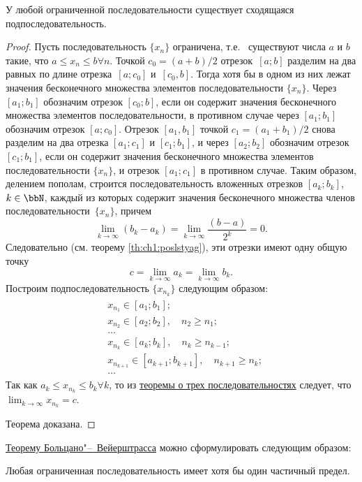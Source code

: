 \begin{thm}\label{th:ch1:TBV}
 У любой ограниченной последовательности существует сходящаяся подпоследовательность.
\end{thm}
\begin{proof}
Пусть последовательность $\{x_n\}$ ограничена, т.е.~ существуют числа $a$ и $b$ такие, что $a \le x_n \le b$\quad$\forall n$. Точкой
$c_0 = (a + b)/2$ отрезок~$[a; b]$ разделим на два равных по длине отрезка~$[a; c_0]$ и~$[c_0,b]$. Тогда хотя бы в одном из них лежат значения бесконечного множества элементов последовательности $\{x_n\}$. Через $[a_1;b_1]$ обозначим отрезок $[c_0;b]$, если он содержит значения бесконечного множества элементов последовательности, в противном случае через $[a_1; b_1]$ обозначим отрезок $[a; c_0]$. Отрезок $[a_1, b_1]$ точкой $c_1 = (a_1 + b_1)/2$ снова разделим на два отрезка $[a_1;c_1]$ и $[c_1;b_1]$, и через $[a_2;b_2]$ обозначим отрезок $[c_1;b_1]$, если он содержит значения бесконечного множества элементов последовательности $\{x_n\}$, и отрезок $[a_1; c_1]$ в противном случае. Таким образом, делением пополам, строится последовательность вложенных отрезков $[a_k;b_k]$, $k \in \bbN$, каждый из которых содержит значения бесконечного множества членов последовательности~$\{x_n\}$, причем
$$
\lim_{k\to \infty}(b_k-a_k)=\lim_{k \to \infty}\frac{(b-a)}{2^k}=0.
$$
Следовательно (см. теорему \ref{th:ch1:poslstyag}), эти отрезки имеют одну общую точку
$$
c = \lim_{k \to \infty} a_k = \lim_{k \to \infty} b_k.
$$
Построим подпоследовательность $\{x_{n_k}\}$ следующим образом:
\begin{gather*}
\begin{aligned}
& x_{n_1} \in [a_1;b_1];\\
& x_{n_2} \in [a_2;b_2],\quad n_2 \ge n_1;\\
& \ldots\\
& x_{n_k} \in [a_k;b_k],\quad n_k \ge n_{k-1};\\
& x_{n_{k+1}} \in [a_{k+1};b_{k+1}],\quad n_{k+1} \ge n_k;\\
& \ldots
\end{aligned}
\end{gather*}
Так как $a_k \le x_{n_k} \le b_k$\quad$\forall k$, то из \hyperref[th:ch1:otrehposled]{теоремы о трех последовательностях} следует, что $\lim_{k \to \infty}\limits x_{n_k} = c$.

Теорема доказана.
\end{proof}

\hyperref[th:ch1:TBV]{Теорему Больцано"--~Вейерштрасса} можно сформулировать следующим образом: 
\begin{thmn} Любая ограниченная последовательность имеет хотя бы один частичный предел.
\end{thmn}

